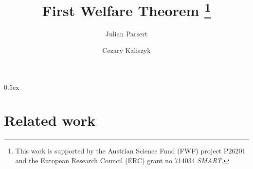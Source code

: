 \documentclass[11pt,a4paper]{article}
\begin{document}
\title{First Welfare Theorem \thanks{%
This work is supported by the Austrian Science Fund (FWF) project P26201 and the European Research Council (ERC) grant no 714034 \emph{SMART}.}}

\author{Julian Parsert \and Cezary Kaliszyk}

\maketitle

\begin{abstract}

\end{abstract}

\tableofcontents

\parindent 0pt\parskip 0.5ex


\section{Related work}

\cite{tadelis2013game}


\end{document}
